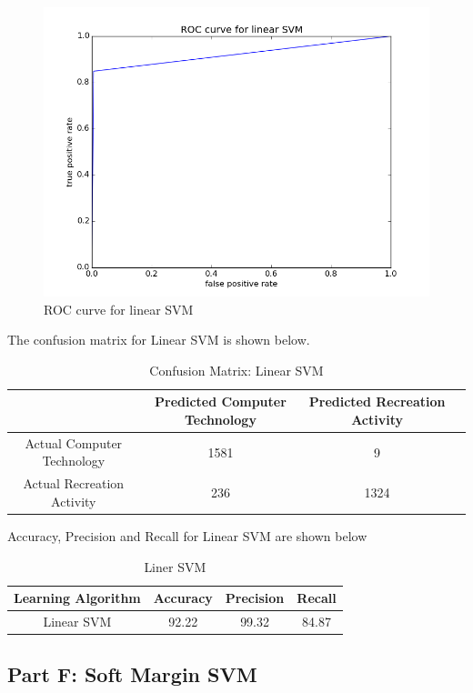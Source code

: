 \documentclass[11pt]{article}
\begin{document}
\begin{figure}[H]
	\centering
	\includegraphics[scale = 0.6]{ROC_SVM.png}
	\caption{ROC curve for linear SVM}
\end{figure}

The confusion matrix for Linear SVM is shown below.
\begin{table}[H]
	\centering
	\begin{tabular}{|c|c|c|c|} \hline
		& Predicted Computer Technology & Predicted Recreation Activity \\ \hline
		Actual Computer Technology & 1581 & 9 \\
		Actual Recreation Activity & 236& 1324  \\
		\hline
	\end{tabular}
	\caption{Confusion Matrix: Linear SVM}
\end{table}


Accuracy, Precision and Recall for Linear SVM are shown below
\begin{table}[H]
	\centering
	\begin{tabular}{|c|c|c|c|} \hline
		Learning Algorithm & Accuracy & Precision & Recall\\ \hline
		Linear SVM & 92.22 & 99.32 & 84.87 \\
		\hline
	\end{tabular}
	\caption{Liner SVM}
\end{table}


\newpage
\subsection{Part F: Soft Margin SVM}
\end{document}

